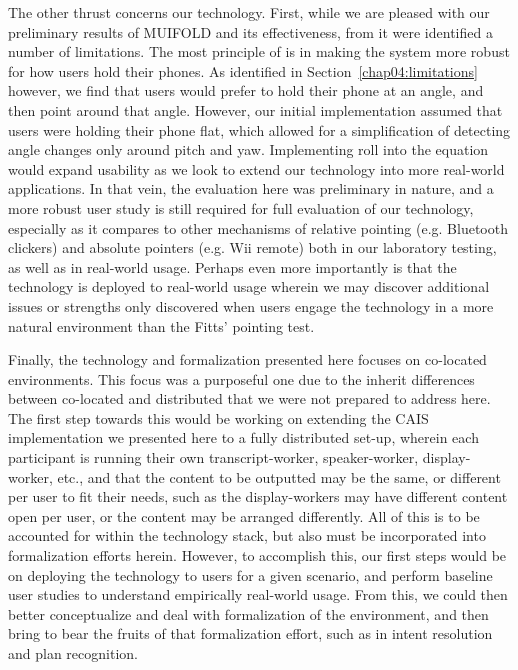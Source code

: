 The other thrust concerns our technology. First, while we are pleased with
our preliminary results of MUIFOLD and its effectiveness, from it were
identified a number of limitations. The most principle of is in making the
system more robust for how users hold their phones. As identified in
Section~\ref{chap04:limitations} however, we find that users would prefer to
hold their phone at an angle, and then point around that angle. However, our
initial implementation assumed that users were holding their phone flat, which
allowed for a simplification of detecting angle changes only around pitch and
yaw. Implementing roll into the equation would expand usability as we look
to extend our technology into more real-world applications. In that vein,
the evaluation here was preliminary in nature, and a more robust user study
is still required for full evaluation of our technology, especially as it
compares to other mechanisms of relative pointing (e.g. Bluetooth clickers)
and absolute pointers (e.g. Wii remote) both in our laboratory testing, as
well as in real-world usage. Perhaps even more importantly is that the
technology is deployed to real-world usage wherein we may discover additional
issues or strengths only discovered when users engage the technology in a
more natural environment than the Fitts' pointing test.

Finally, the technology and formalization presented here focuses on
co-located environments. This focus was a purposeful one due to the
inherit differences between co-located and distributed that we were
not prepared to address here. The first step towards this would be
working on extending the CAIS implementation we presented here to
a fully distributed set-up, wherein each participant is running their
own transcript-worker, speaker-worker, display-worker, etc., and that
the content to be outputted may be the same, or different per user to
fit their needs, such as the display-workers may have different content
open per user, or the content may be arranged differently. All of this
is to be accounted for within the technology stack, but also must be
incorporated into formalization efforts herein. However, to accomplish this,
our first steps would be on deploying the technology to users for a
given scenario, and perform baseline user studies to understand empirically
real-world usage. From this, we could then better conceptualize and deal
with formalization of the environment, and then bring to bear the fruits
of that formalization effort, such as in intent resolution and plan recognition.